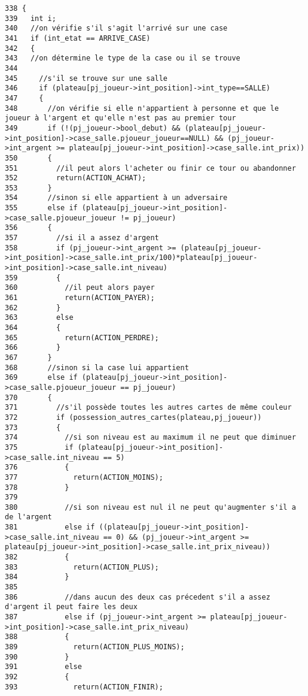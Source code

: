 \begin{Code}\begin{verbatim}338 {
339   int i;
340   //on vérifie s'il s'agit l'arrivé sur une case
341   if (int_etat == ARRIVE_CASE)
342   { 
343   //on détermine le type de la case ou il se trouve
344   
345     //s'il se trouve sur une salle
346     if (plateau[pj_joueur->int_position]->int_type==SALLE)
347     {
348       //on vérifie si elle n'appartient à personne et que le joueur à l'argent et qu'elle n'est pas au premier tour
349       if (!(pj_joueur->bool_debut) && (plateau[pj_joueur->int_position]->case_salle.pjoueur_joueur==NULL) && (pj_joueur->int_argent >= plateau[pj_joueur->int_position]->case_salle.int_prix))
350       {
351         //il peut alors l'acheter ou finir ce tour ou abandonner
352         return(ACTION_ACHAT);
353       }
354       //sinon si elle appartient à un adversaire
355       else if (plateau[pj_joueur->int_position]->case_salle.pjoueur_joueur != pj_joueur)
356       {
357         //si il a assez d'argent
358         if (pj_joueur->int_argent >= (plateau[pj_joueur->int_position]->case_salle.int_prix/100)*plateau[pj_joueur->int_position]->case_salle.int_niveau)
359         {
360           //il peut alors payer
361           return(ACTION_PAYER);
362         }
363         else
364         {
365           return(ACTION_PERDRE);
366         }
367       }
368       //sinon si la case lui appartient
369       else if (plateau[pj_joueur->int_position]->case_salle.pjoueur_joueur == pj_joueur)
370       {
371         //s'il possède toutes les autres cartes de même couleur
372         if (possession_autres_cartes(plateau,pj_joueur))
373         {
374           //si son niveau est au maximum il ne peut que diminuer
375           if (plateau[pj_joueur->int_position]->case_salle.int_niveau == 5)
376           {
377             return(ACTION_MOINS);
378           }
379           
380           //si son niveau est nul il ne peut qu'augmenter s'il a de l'argent
381           else if ((plateau[pj_joueur->int_position]->case_salle.int_niveau == 0) && (pj_joueur->int_argent >= plateau[pj_joueur->int_position]->case_salle.int_prix_niveau))
382           {
383             return(ACTION_PLUS);
384           }
385           
386           //dans aucun des deux cas précedent s'il a assez d'argent il peut faire les deux
387           else if (pj_joueur->int_argent >= plateau[pj_joueur->int_position]->case_salle.int_prix_niveau)
388           {
389             return(ACTION_PLUS_MOINS);
390           }
391           else 
392           {
393             return(ACTION_FINIR);

\end{verbatim}
\end{Code}
